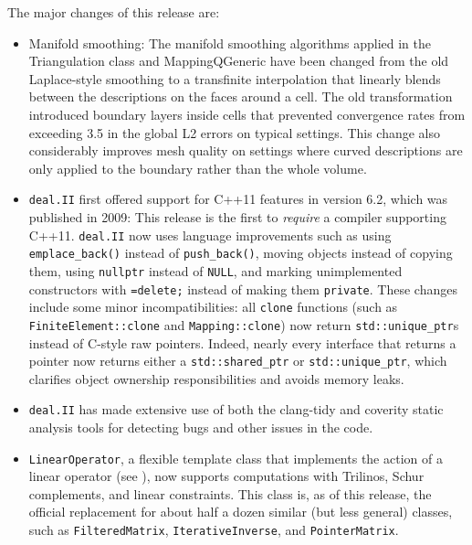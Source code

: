 \documentclass{ansarticle-preprint}
\newcommand{\specialword}[1]{\texttt{#1}}
\newcommand{\dealii}{{\specialword{deal.II}}}
\begin{document}
The major changes of this release are:
\begin{itemize}
\item
  Manifold smoothing: The manifold smoothing algorithms applied in the
  Triangulation class and MappingQGeneric have been changed from the old
  Laplace-style smoothing to a transfinite interpolation that linearly
  blends between the descriptions on the faces around a cell. The old
  transformation introduced boundary layers inside cells that prevented
  convergence rates from exceeding 3.5 in the global L2 errors on typical
  settings. This change also considerably improves mesh quality on settings
  where curved descriptions are only applied to the boundary rather than
  the whole volume.

\item
  \dealii{} first offered support for C++11 features in version 6.2, which was
  published in 2009: This release is the first to \emph{require} a compiler
  supporting C++11. \dealii{} now uses language improvements such as using
  \texttt{emplace\_back()} instead of \texttt{push\_back()}, moving objects
  instead of copying them, using \texttt{nullptr} instead of \texttt{NULL}, and
  marking unimplemented constructors with \texttt{=delete;} instead of making
  them \texttt{private}. These changes include some minor incompatibilities: all
  \texttt{clone} functions (such as \texttt{FiniteElement::clone} and
  \texttt{Mapping::clone}) now return \texttt{std::unique\_ptr}s instead of
  C-style raw pointers. Indeed, nearly every interface that returns a pointer
  now returns either a \texttt{std::shared\_ptr} or \texttt{std::unique\_ptr},
  which clarifies object ownership responsibilities and avoids memory leaks.

\item \dealii{} has made extensive use of both the clang-tidy and coverity
      static analysis tools for detecting bugs and other issues in the code.

\item
  \texttt{LinearOperator}, a flexible template class that implements the action of a
  linear operator (see \cite{MaierBardelloniHeltai-2016-b}), now supports
  computations with Trilinos, Schur complements, and linear constraints. This
  class is, as of this release, the official replacement for about half a dozen
  similar (but less general) classes, such as \texttt{FilteredMatrix},
  \texttt{IterativeInverse}, and \texttt{PointerMatrix}.


\end{itemize}
\end{document}
